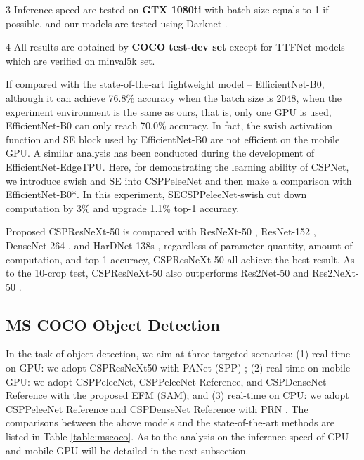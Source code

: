 \documentclass{article}
\begin{document}
\begin{table*}[t]
\begin{threeparttable}[t]
\begin{tablenotes}[flushleft]
			\item[3] Inference speed are tested on \textbf{GTX 1080ti} with batch size equals to 1 if possible, and our models are tested using Darknet \cite{alexeyab84_darknet}.
			\item[4] All results are obtained by \textbf{COCO test-dev set} except for TTFNet \cite{liu2019training} models which are verified on minval5k set.
		\end{tablenotes}
	\end{threeparttable}
\end{table*}

If compared with the state-of-the-art lightweight model -- EfficientNet-B0, although it can achieve 76.8\% accuracy when the batch size is 2048, when the experiment environment is the same as ours, that is, only one GPU is used, EfficientNet-B0 can only reach 70.0\% accuracy.  In fact, the swish activation function and SE block used by EfficientNet-B0 are not efficient on the mobile GPU.  A similar analysis has been conducted during the development of EfficientNet-EdgeTPU.  Here, for demonstrating the learning ability of CSPNet, we introduce swish and SE into CSPPeleeNet and then make a comparison with EfficientNet-B0*.  In this experiment, SECSPPeleeNet-swish cut down computation by 3\% and upgrade 1.1\% top-1 accuracy.

Proposed CSPResNeXt-50 is compared with ResNeXt-50 \cite{xie2017aggregated}, ResNet-152 \cite{he2016deep}, DenseNet-264 \cite{huang2017densely}, and HarDNet-138s \cite{chao2019hardnet}, regardless of parameter quantity, amount of computation, and top-1 accuracy, CSPResNeXt-50 all achieve the best result.  As to the 10-crop test, CSPResNeXt-50 also outperforms Res2Net-50 \cite{gao2019res2net} and Res2NeXt-50 \cite{gao2019res2net}.

\subsection{MS COCO Object Detection}

In the task of object detection, we aim at three targeted scenarios: (1) real-time on GPU: we adopt CSPResNeXt50 with PANet (SPP) \cite{liu2018path}; (2) real-time on mobile GPU: we adopt CSPPeleeNet, CSPPeleeNet Reference, and CSPDenseNet Reference with the proposed EFM (SAM); and (3) real-time on CPU: we adopt CSPPeleeNet Reference and CSPDenseNet Reference with PRN \cite{wang2019enriching}.  The comparisons between the above models and the state-of-the-art methods are listed in Table \ref{table:mscoco}.  As to the analysis on the inference speed of CPU and mobile GPU will be detailed in the next subsection.
\end{document}
